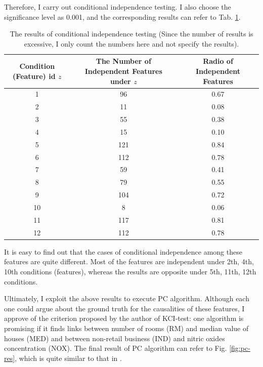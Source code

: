 \documentclass[12pt,a4paper]{article}
\theoremstyle{definition}
\begin{document}
\vspace{0.008\linewidth}
Therefore, I carry out conditional independence testing. I also choose the significance level as 0.001, and the corresponding results can refer to Tab. \ref{tab:con-in}.

\begin{table}[H]
	\renewcommand\arraystretch{1.35}
	\caption{The results of conditional independence testing (Since the number of results is excessive, I only count the numbers here and not specify the results).}
	\label{tab:con-in}
	\centering
	
	\begin{tabular}{c|c|c}
		\centering
		Condition (Feature) id $z$ & The Number of Independent Features under $z$ & Radio of Independent Features \\
		\hline
		1 & 96 & 0.67 \\
		\hline
		2 & 11 & 0.08 \\
		\hline
		3 & 55 & 0.38 \\
		\hline
		4 & 15 & 0.10 \\
		\hline
		5 & 121 & 0.84 \\
		\hline
		6 & 112 & 0.78 \\
		\hline
		7 & 59 & 0.41 \\
		\hline
		8 & 79 & 0.55 \\
		\hline
		9 & 104 & 0.72 \\
		\hline
		10 & 8 & 0.06 \\
		\hline
		11 & 117 & 0.81 \\
		\hline
		12 & 112 & 0.78 \\
	\end{tabular}
\end{table}

It is easy to find out that the cases of conditional independence among these features are quite different. Most of the features are independent under 2th, 4th, 10th conditions (features), whereas the results are opposite under 5th, 11th, 12th conditions.

\vspace{0.008\linewidth}
Ultimately, I exploit the above results to execute PC algorithm. Although each one could argue about the ground truth for the causalities of these features, I approve of the criterion proposed by the author of KCI-test: one algorithm is promising if it finds links between number of rooms (RM) and median value of houses (MED) and between non-retail business (IND) and nitric oxides concentration (NOX). The final result of PC algorithm can refer to Fig. \ref{fig:pc-res}, which is quite similar to that in \cite{alg}.
\end{document}
